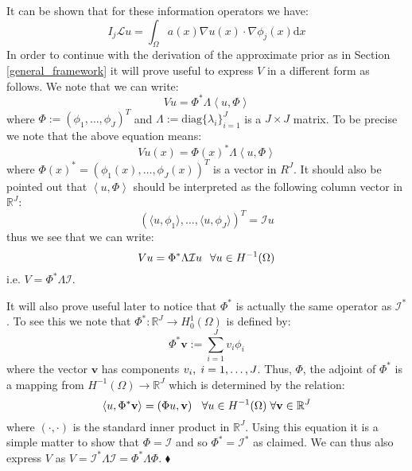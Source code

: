 It can be shown that for these information operators we have:
\begin{equation}
    \label{info_operator_with_pde_op}
    I_{j}\mathcal{L}u=\int_{\Omega}a(x)\nabla u(x)\cdot\nabla \phi_{j}(x)\mathrm{d}x
\end{equation}
In order to continue with the derivation of the approximate prior as in Section \textcolor{blue}{\ref{general_framework}} it will prove useful to express $V$ in a different form as follows. We note that we can write:
\begin{equation}
    Vu = \Phi^{*}\Lambda\left\langle u, \Phi\right\rangle
\end{equation}
where $\Phi:=(\phi_{1},\dots,\phi_{J})^{T}$ and $\Lambda:=\text{diag}\{\lambda_{i}\}_{i=1}^{J}$ is a $J\times J$ matrix. To be precise we note that the above equation means:
\begin{equation}
    Vu(x) = \Phi(x)^{*}\Lambda\left\langle u,\Phi\right\rangle
\end{equation}
where $\Phi(x)^{*}=(\phi_{1}(x),\dots,\phi_{J}(x))^{T}$ is a vector in $R^{J}$. It should also be pointed out that $\left\langle u,\Phi\right\rangle$ should be interpreted as the following column vector in $\mathbb{R}^{J}$:
\begin{equation}
    (\langle u,\phi_{1}\rangle,\dots,\langle u,\phi_{J}\rangle)^{T}=\mathcal{I}u
\end{equation}
thus we see that we can write:
\begin{equation}
    Vu=\Phi^{*}\Lambda\mathcal{I}u \hspace{0.25cm} \forall u\in H^{-1}(\Omega)
\end{equation}
i.e. $V=\Phi^{*}\Lambda\mathcal{I}$. \vspace{5pt}

\begin{remark}
    It will also prove useful later to notice that $\Phi^{*}$ is actually the same operator as $\mathcal{I}^{*}$. To see this we note that $\Phi^{*}:\mathbb{R}^{J}\rightarrow H_{0}^{1}(\Omega)$ is defined by:
    \begin{equation}
        \label{projection_into_fem_space}
        \Phi^{*}\mathbf{v}:=\sum_{i=1}^{J}v_{i}\phi_{i}
    \end{equation}
    where the vector $\mathbf{v}$ has components $v_{i}, \hspace{0.1cm} i=1,\dots,J$. Thus, $\Phi$, the adjoint of $\Phi^{*}$ is a mapping from $H^{-1}(\Omega)\rightarrow\mathbb{R}^{J}$ which is determined by the relation:
    \begin{equation}
        \langle u,\Phi^{*}\mathbf{v}\rangle = \left(\Phi u,\mathbf{v}\right) \hspace{0.25cm} \forall u\in H^{-1}(\Omega) \hspace{0.1cm} \forall \mathbf{v}\in\mathbb{R}^{J}
    \end{equation}
    where $(\boldsymbol{\cdot},\boldsymbol{\cdot})$ is the standard inner product in $\mathbb{R}^{J}$. Using this equation it is a simple matter to show that $\Phi=\mathcal{I}$ and so $\Phi^{*}=\mathcal{I}^{*}$ as claimed. We can thus also express $V$ as $V=\mathcal{I}^{*}\Lambda\mathcal{I}=\Phi^{*}\Lambda\Phi$.
    $\mathbin{\blacklozenge}$
\end{remark}


